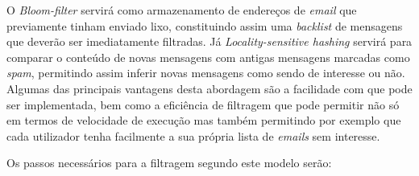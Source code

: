 \documentclass[a4paper,11pt,openright,oneside]{report}
\begin{document}
O \textit{Bloom-filter} servirá como armazenamento de endereços de \textit{email} que previamente tinham enviado lixo, constituindo assim uma \textit{backlist} de mensagens que deverão ser imediatamente filtradas. Já \textit{Locality-sensitive hashing} servirá para comparar o conteúdo de novas mensagens com antigas mensagens marcadas como \textit{spam}, permitindo assim inferir novas mensagens como sendo de interesse ou não. Algumas das principais vantagens desta abordagem são a facilidade com que pode ser implementada, bem como a eficiência de filtragem que pode permitir não só em termos de velocidade de execução mas também permitindo por exemplo que cada utilizador tenha facilmente a sua própria lista de \textit{emails} sem interesse.

Os passos necessários para a filtragem segundo este modelo serão:
\end{document}
